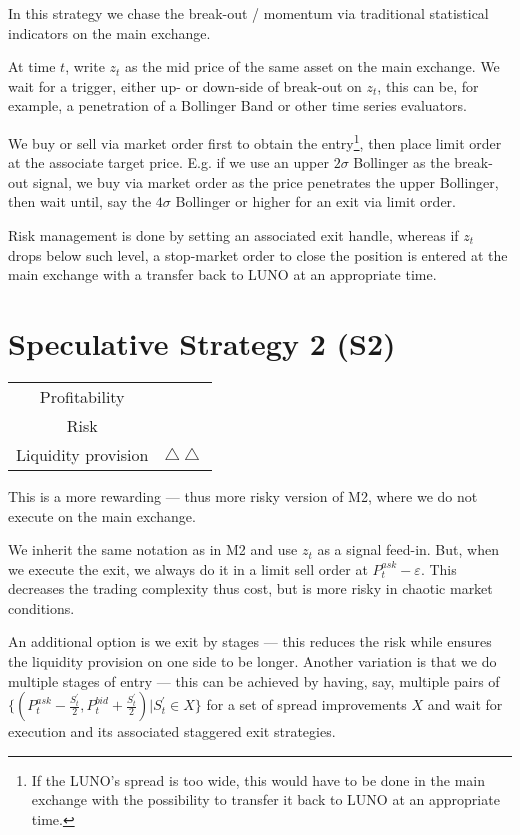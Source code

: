 \documentclass[12pt,a4paper]{article}
\begin{document}
In this strategy we chase the break-out / momentum via traditional statistical indicators on the main exchange.

At time $t$, write $z_t$ as the mid price of the same asset on the main exchange. We wait for a trigger, either up- or down-side of break-out on $z_t$, this can be, for example, a penetration of a Bollinger Band or other time series evaluators.

We buy or sell via market order first to obtain the entry\footnote{If the LUNO's spread is too wide, this would have to be done in the main exchange with the possibility to transfer it back to LUNO at an appropriate time.}, then place limit order at the associate target price. E.g. if we use an upper $2\sigma$ Bollinger as the break-out signal, we buy via market order as the price penetrates the upper Bollinger, then wait until, say the  $4\sigma$ Bollinger or higher for an exit via limit order.

Risk management is done by setting an associated exit handle, whereas if $z_t$ drops below such level, a stop-market order to close the position is entered at the main exchange with a transfer back to LUNO at an appropriate time.
\section{Speculative Strategy 2 (S2)}

\begin{table}[h]
	\centering
	\begin{tabular}{c|c}
		
		Profitability& \textdollaroldstyle  \textdollaroldstyle \\
		
		Risk & \Radioactivity  \Radioactivity \\
		
		Liquidity provision &$ \bigtriangleup \bigtriangleup$\\
		
	\end{tabular}
\end{table}
This is a more rewarding --- thus more risky version of M2, where we do not execute on the main exchange.

We inherit the same notation as in M2 and use $z_t$ as a signal feed-in. But, when we execute the exit, we always do it in a limit sell order at $P^{ask}_t - \varepsilon$. This decreases the trading complexity thus cost, but is more risky in chaotic market conditions.

An additional option is we exit by stages --- this reduces the risk while ensures the liquidity provision on one side to be longer. Another variation is that we do multiple stages of entry --- this can be achieved by having, say, multiple 
pairs of $\{(P^{ask}_t - \frac{S_t^\prime}{2} , P^{bid}_t + \frac{S_t^\prime}{2}) | S_t^\prime \in X \}$ for a set of spread improvements $X$ and wait for execution and its associated staggered exit strategies. 
\end{document}
